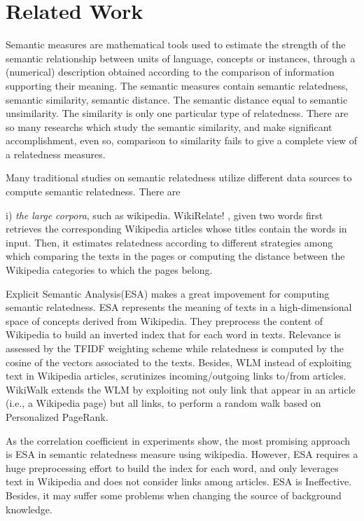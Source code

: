 \section{Related Work}
Semantic measures are mathematical tools used to estimate the strength of the 
semantic relationship between units of language, concepts or instances, through 
a (numerical) description obtained according to the comparison of information 
supporting their meaning. The semantic measures contain semantic relatedness,
semantic similarity, semantic distance. The semantic distance equal to semantic 
unsimilarity. The similarity is only one particular type of relatedness.
There are so many researchs \cite{acl/IacobacciPN15, tkde/ZhuI17, tkde/LiBM03}
which study the semantic similarity, and make significant accomplishment, even so,
comparison to similarity fails to give a complete view of a relatedness measures.

Many traditional studies on semantic relatedness
utilize different data sources to compute semantic relatedness. There are

i) \emph{the large corpora}, such as wikipedia. 
WikiRelate! \cite{aaai/StrubeP06}, given two words
first retrieves the corresponding Wikipedia articles whose titles
contain the words in input. Then, it estimates relatedness
according to different strategies among which comparing
the texts in the pages or computing the distance between
the Wikipedia categories to which the pages belong.

Explicit Semantic Analysis(ESA) \cite{ijcai/GabrilovichM07} makes a great impovement for computing semantic relatedness. 
ESA represents the meaning of texts in a high-dimensional space of concepts derived from Wikipedia.
They preprocess the content of Wikipedia to build an inverted index that for each word in texts.
Relevance is assessed by the TFIDF weighting scheme while relatedness is computed by
the cosine of the vectors associated to the texts.
Besides, WLM \cite{aaai/Milne08} instead of exploiting text in Wikipedia articles, 
scrutinizes incoming/outgoing links to/from articles. WikiWalk \cite{textgraphs/YehRMAS09} extends the
WLM by exploiting not only link that appear in an article (i.e., a Wikipedia page) but all 
links, to perform a random walk based on Personalized PageRank.

As the correlation coefficient in experiments show, the most promising approach is ESA in semantic 
relatedness measure using wikipedia. 
However, ESA requires a huge preprocessing effort to build the index for each word,
and only leverages text in Wikipedia and does not consider links among articles. ESA is Ineffective.
Besides, it may suffer some problems when changing the source of background knowledge.


